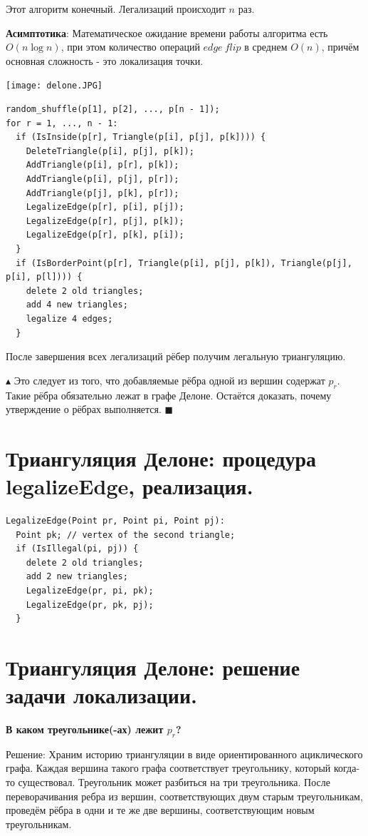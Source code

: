 Этот алгоритм конечный. Легализаций происходит $n$ раз.

\textbf{Асимптотика}: Математическое ожидание времени работы алгоритма есть $O (n \log n)$, при этом количество операций $edge \ flip$ в среднем $O (n)$, причём основная сложность - это локализация точки.

\texttt{[image: delone.JPG]}

\begin{lstlisting}
random_shuffle(p[1], p[2], ..., p[n - 1]);
for r = 1, ..., n - 1:
  if (IsInside(p[r], Triangle(p[i], p[j], p[k]))) {
    DeleteTriangle(p[i], p[j], p[k]);
    AddTriangle(p[i], p[r], p[k]);
    AddTriangle(p[i], p[j], p[r]);
    AddTriangle(p[j], p[k], p[r]);
    LegalizeEdge(p[r], p[i], p[j]);
    LegalizeEdge(p[r], p[j], p[k]);
    LegalizeEdge(p[r], p[k], p[i]);
  }
  if (IsBorderPoint(p[r], Triangle(p[i], p[j], p[k]), Triangle(p[j], p[i], p[l]))) {
    delete 2 old triangles;
    add 4 new triangles;
    legalize 4 edges;
  }
\end{lstlisting}

После завершения всех легализаций рёбер получим легальную триангуляцию.

$\blacktriangle$ Это следует из того, что добавляемые рёбра одной из вершин содержат $p_r$. Такие рёбра обязательно лежат в графе Делоне. Остаётся доказать, почему утверждение о рёбрах выполняется. $\blacksquare$
\newpage{}

\section{Триангуляция Делоне: процедура legalizeEdge, реализация.}
\begin{lstlisting}
LegalizeEdge(Point pr, Point pi, Point pj):
  Point pk; // vertex of the second triangle;
  if (IsIllegal(pi, pj)) {
    delete 2 old triangles;
    add 2 new triangles;
    LegalizeEdge(pr, pi, pk);
    LegalizeEdge(pr, pk, pj);
  }
\end{lstlisting}

\section{Триангуляция Делоне: решение задачи локализации.}

\textbf{В каком треугольнике(-ах) лежит $p_r$?}

Решение: Храним историю триангуляции в виде ориентированного ациклического графа. Каждая вершина такого графа соответствует треугольнику, который когда-то существовал. Треугольник может разбиться на три треугольника. После переворачивания ребра из вершин, соответствующих двум старым треугольникам, проведём рёбра в одни и те же две вершины, соответствующим новым треугольникам.

